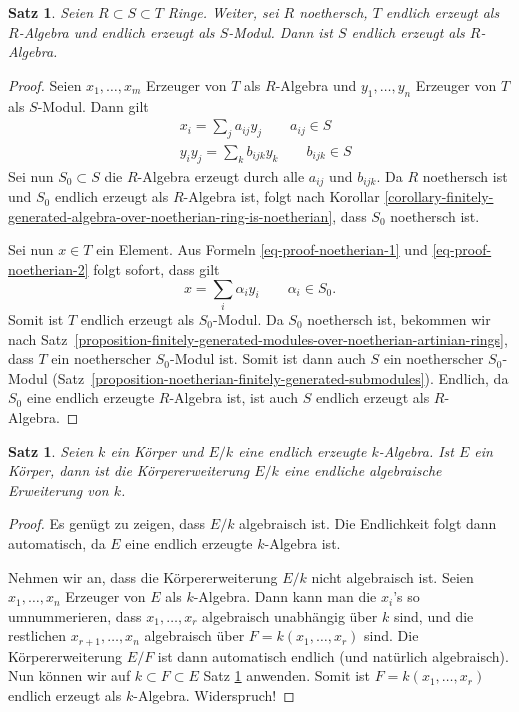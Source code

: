 \documentclass[reqno,12pt]{article}
\numberwithin{equation}{section}
\theoremstyle{plain}
\newtheorem{proposition}[thm]{Satz}
\theoremstyle{definition}
\begin{document}
\begin{proposition}\label{proposition-8.11}
Seien $R \subset S \subset T$ Ringe. Weiter, sei $R$ noethersch, $T$ endlich erzeugt als $R$-Algebra und endlich erzeugt als $S$-Modul. Dann ist $S$ endlich erzeugt als $R$-Algebra.
\end{proposition}


\begin{proof}
Seien $x_1, \dots, x_m$ Erzeuger von $T$ als $R$-Algebra und $y_1, \dots , y_n$ Erzeuger von $T$ als $S$-Modul. Dann gilt
\begin{align}\label{eq-proof-noetherian-1}
& x_i = \sum_j a_{ij} y_j \qquad a_{ij} \in S  \\ \label{eq-proof-noetherian-2}
& y_iy_j = \sum_k b_{ijk} y_k  \qquad b_{ijk} \in S
\end{align}
Sei nun $S_0 \subset S$ die $R$-Algebra erzeugt durch alle $a_{ij}$ und $b_{ijk}$. Da $R$ noethersch ist und $S_0$ endlich erzeugt als $R$-Algebra ist, folgt nach Korollar \ref{corollary-finitely-generated-algebra-over-noetherian-ring-is-noetherian}, dass $S_0$
noethersch ist.

Sei nun $x \in T$ ein Element. Aus Formeln \eqref{eq-proof-noetherian-1} und \eqref{eq-proof-noetherian-2} folgt sofort, dass gilt
$$
x = \sum_i \alpha_i y_i \qquad \alpha_i \in S_0.
$$
Somit ist $T$ endlich erzeugt als $S_0$-Modul. Da $S_0$ noethersch ist, bekommen wir nach Satz~\ref{proposition-finitely-generated-modules-over-noetherian-artinian-rings}, dass $T$ ein noetherscher $S_0$-Modul ist. Somit ist dann auch $S$ ein noetherscher $S_0$-Modul (Satz~\ref{proposition-noetherian-finitely-generated-submodules}). Endlich, da $S_0$ eine endlich erzeugte $R$-Algebra ist, ist auch $S$ endlich erzeugt als $R$-Algebra.
\end{proof}




\begin{proposition}
Seien $k$ ein Körper und $E/k$ eine endlich erzeugte $k$-Algebra. Ist $E$ ein Körper, dann ist die Körpererweiterung $E/k$ eine endliche algebraische Erweiterung von $k$.
\end{proposition}

\begin{proof}

Es genügt zu zeigen, dass $E/k$ algebraisch ist. Die Endlichkeit folgt dann automatisch, da $E$ eine endlich erzeugte $k$-Algebra ist.

\smallskip

 Nehmen wir an, dass die Körpererweiterung $E/k$ nicht algebraisch ist. Seien $x_1, \dots, x_n$ Erzeuger von $E$ als $k$-Algebra. Dann kann man die $x_i$'s so umnummerieren, dass $x_1, \dots, x_r$ algebraisch unabhängig über $k$ sind, und die restlichen $x_{r+1}, \dots, x_n$ algebraisch über $F=k(x_1, \dots, x_r)$ sind. Die Körpererweiterung $E/F$ ist dann automatisch endlich (und natürlich algebraisch). Nun können wir auf $k \subset F \subset E$ Satz \ref{proposition-8.11} anwenden. Somit ist $F=k(x_1, \dots, x_r)$ endlich erzeugt als $k$-Algebra. Widerspruch!
\end{proof}
\end{document}
